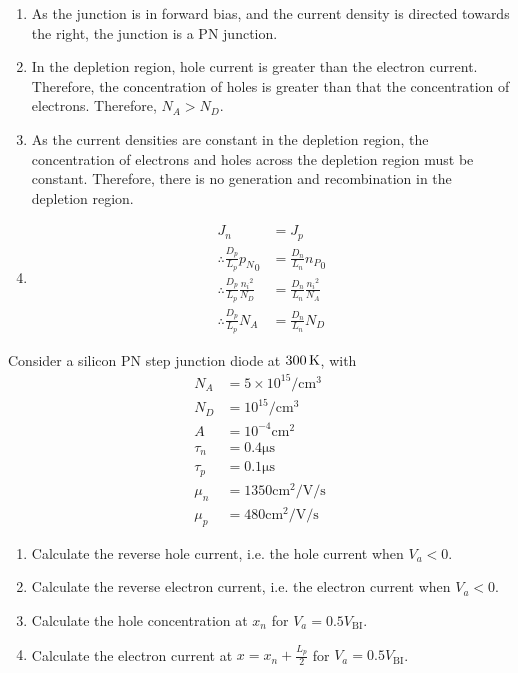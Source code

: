 \documentclass[fleqn, a4paper, 10pt, oneside]{amsart}
\theoremstyle{definition}
\theoremstyle{theorem}
\begin{document}
\begin{solution}
	\begin{enumerate}[leftmargin=*]
		\item
			As the junction is in forward bias, and the current density is directed towards the right, the junction is a PN junction.
		\item
			In the depletion region, hole current is greater than the electron current.
			Therefore, the concentration of holes is greater than that the concentration of electrons.
			Therefore, $N_A > N_D$.
		\item
			As the current densities are constant in the depletion region, the concentration of electrons and holes across the depletion region must be constant.
			Therefore, there is no generation and recombination in the depletion region.
		\item
			\begin{align*}
				J_n &= J_p\\
				\therefore \frac{D_p}{L_p} {p_N}_0 &= \frac{D_n}{L_n} {n_P}_0\\
				\therefore \frac{D_p}{L_p} \frac{{n_i}^2}{N_D} &= \frac{D_n}{L_n} \frac{{n_i}^2}{N_A}\\
				\therefore \frac{D_p}{L_p} N_A &= \frac{D_n}{L_n} N_D
			\end{align*}
	\end{enumerate}
\end{solution}

\begin{question}
	Consider a silicon PN step junction diode at $300 \kelvin$, with
	\begin{align*}
		N_A &= 5 \times 10^{15} \si{\per\centi\metre\cubed}\\
		N_D &= 10^{15} \si{\per\centi\metre\cubed}\\
		A &= 10^{-4} \si{\centi\metre\squared}\\
		\tau_n &= 0.4 \si{\micro\second}\\
		\tau_p &= 0.1 \si{\micro\second}\\
		\mu_n &= 1350 \si{\centi\metre\squared\per\volt\per\second}\\
		\mu_p &= 480 \si{\centi\metre\squared\per\volt\per\second}
	\end{align*}
	\begin{enumerate}
		\item Calculate the reverse hole current, i.e. the hole current when $V_a < 0$.
		\item Calculate the reverse electron current, i.e. the electron current when $V_a < 0$.
		\item Calculate the hole concentration at $x_n$ for $V_a = 0.5 V_{\text{BI}}$.
		\item Calculate the electron current at $x = x_n + \frac{L_p}{2}$ for $V_a = 0.5 V_{\text{BI}}$.
	\end{enumerate}
\end{question}
\end{document}
